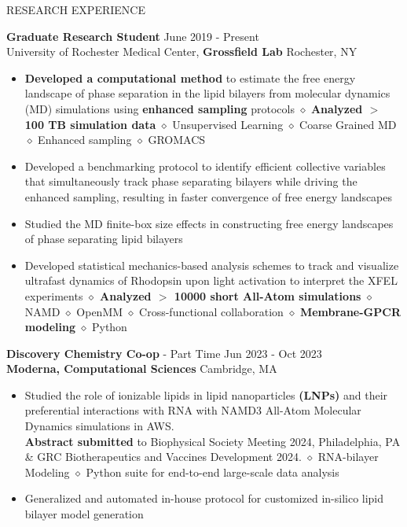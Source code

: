 \documentclass{resume} %
\begin{document}
\begin{rSection}{RESEARCH EXPERIENCE}

   \textbf{Graduate Research Student} \hfill June 2019 - Present\\
   University of Rochester Medical Center, \textbf{Grossfield Lab} \hfill Rochester, NY
   \begin{itemize}
      \itemsep -1pt {}
      \item \textbf{Developed a computational method} to estimate the free energy landscape of phase separation in the lipid bilayers from molecular dynamics (MD) simulations using \textbf{enhanced sampling} protocols
            $\diamond$ \textbf{Analyzed $>$ 100 TB simulation data} $\diamond$ Unsupervised Learning $\diamond$ Coarse Grained MD $\diamond$ Enhanced sampling $\diamond$ GROMACS
      \item Developed a benchmarking protocol to identify efficient collective variables that simultaneously track phase separating bilayers while driving the enhanced sampling, resulting in faster convergence of free energy landscapes
      \item Studied the MD finite-box size effects in constructing free energy landscapes of phase separating lipid bilayers
      \item Developed statistical mechanics-based analysis schemes to track and visualize ultrafast dynamics of Rhodopsin upon light activation to interpret the XFEL experiments \textbf{$\diamond$ Analyzed $>$ 10000 short All-Atom simulations}
            $\diamond$ NAMD $\diamond$ OpenMM $\diamond$ Cross-functional collaboration $\diamond$  \textbf{Membrane-GPCR modeling} $\diamond$ Python
   \end{itemize}

   \textbf{Discovery Chemistry Co-op} - Part Time \hfill Jun 2023 - Oct 2023\\
   \textbf{Moderna, Computational Sciences} \hfill {Cambridge, MA}
   \begin{itemize}
      \itemsep -1pt {}
      \item Studied the role of ionizable lipids in lipid nanoparticles \textbf{(LNPs)} and their preferential interactions with RNA with NAMD3 All-Atom Molecular Dynamics simulations in AWS.\\
            \textbf{Abstract submitted} to Biophysical Society Meeting 2024, Philadelphia, PA \& GRC Biotherapeutics and Vaccines Development 2024.
            $\diamond$ RNA-bilayer Modeling $\diamond$ Python suite for end-to-end large-scale data analysis
      \item Generalized and automated in-house protocol for customized in-silico lipid bilayer model generation
   \end{itemize}


\end{rSection}
\end{document}
